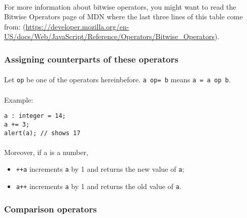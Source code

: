 \documentclass{article}
\begin{document}
\begin{sloppypar}
         
\paragraph{}
For more information about bitwise operators, you might want to read the Bitwise Operators page of MDN where the last three lines of this table come from: (\href{https://developer.mozilla.org/en-US/docs/Web/JavaScript/Reference/Operators/Bitwise\_Operators}{https://developer.mozilla.org/en-US/docs/Web/JavaScript/Reference/Operators/Bitwise\_Operators}).
      

      

\subsubsection{ Assigning counterparts of these operators}


\paragraph{}
Let \lstinline!op! be one of the operators hereinbefore. \lstinline!a op= b! means \lstinline!a = a op b!.

         
\paragraph{}
Example:

{\begin{lstlisting}
a : integer = 14;
a += 3;
alert(a); // shows 17
\end{lstlisting}
}


         
\paragraph{}
Moreover, if a is a number,
         
\begin{itemize}
	\item{ \lstinline!++a! increments \lstinline!a! by 1 and returns the new value of \lstinline!a!;}
	\item{ \lstinline!a++! increments \lstinline!a! by 1 and returns the old value of \lstinline!a!.}
\end{itemize}


      

\subsubsection{ Comparison operators}


\end{sloppypar}
\end{document}
